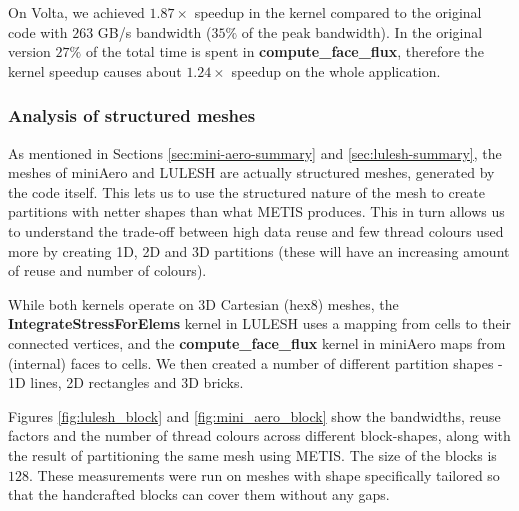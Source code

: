 On Volta, we achieved $1.87\times$ speedup in the kernel compared to the
original code with $263$ GB/s bandwidth ($35\%$ of the peak bandwidth). In the
original version $27\%$ of the total time is spent in
\textbf{compute\_face\_flux}, therefore the kernel speedup causes about
$1.24\times$ speedup on the whole application.


\subsubsection{Analysis of structured meshes}

As mentioned in Sections \ref{sec:mini-aero-summary} and
\ref{sec:lulesh-summary}, the meshes of miniAero and LULESH are actually structured meshes, generated by the
code itself. This lets us to use the structured nature of the mesh to create partitions with netter shapes than what METIS produces. This in turn allows us to understand the trade-off between
high data reuse and few thread colours used more by creating 1D, 2D and 3D
partitions (these will have an increasing amount of reuse and number of colours).

While both kernels operate on 3D Cartesian (hex8) meshes, the
\textbf{IntegrateStressForElems} kernel in LULESH uses a mapping from cells to their
connected vertices, and the \textbf{compute\_face\_flux} kernel in miniAero maps from
(internal) faces to cells. We then created a number of different partition shapes - 1D lines, 2D rectangles and 3D bricks.


Figures \ref{fig:lulesh_block} and \ref{fig:mini_aero_block} show the
bandwidths, reuse factors and the number of thread colours across different
block-shapes, along with the result of partitioning the same mesh using METIS.
The size of the blocks is $128$. These measurements were run on meshes with
shape specifically tailored so that the handcrafted blocks can cover them
without any gaps.

